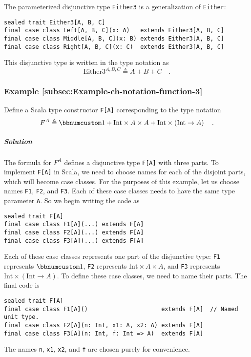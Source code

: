 The parameterized disjunctive type \lstinline!Either3! is a generalization
of \lstinline!Either!:
\begin{lstlisting}
sealed trait Either3[A, B, C]
final case class Left[A, B, C](x: A)   extends Either3[A, B, C]
final case class Middle[A, B, C](x: B) extends Either3[A, B, C]
final case class Right[A, B, C](x: C)  extends Either3[A, B, C]
\end{lstlisting}
This disjunctive type is written in the type notation as
\[
\text{Either3}^{A,B,C}\triangleq A+B+C\quad.
\]


\subsubsection{Example \label{subsec:Example-ch-notation-function-3}\ref{subsec:Example-ch-notation-function-3}}

Define a Scala type constructor \lstinline!F[A]! corresponding to
the type notation 
\[
F^{A}\triangleq\bbnum 1+\text{Int}\times A\times A+\text{Int}\times\left(\text{Int}\rightarrow A\right)\quad.
\]


\subparagraph{Solution}

The formula for $F^{A}$ defines a disjunctive type \lstinline!F[A]!
with three parts. To implement \lstinline!F[A]! in Scala, we need
to choose names for each of the disjoint parts, which will become
case classes. For the purposes of this example, let us choose names
\lstinline!F1!, \lstinline!F2!, and \lstinline!F3!. Each of these
case classes needs to have the same type parameter \lstinline!A!.
So we begin writing the code as
\begin{lstlisting}
sealed trait F[A]
final case class F1[A](...) extends F[A]
final case class F2[A](...) extends F[A]
final case class F3[A](...) extends F[A]
\end{lstlisting}
Each of these case classes represents one part of the disjunctive
type: \lstinline!F1! represents $\bbnum 1$, \lstinline!F2! represents
$\text{Int}\times A\times A$, and \lstinline!F3! represents $\text{Int}\times\left(\text{Int}\rightarrow A\right)$.
To define these case classes, we need to name their parts. The final
code is
\begin{lstlisting}
sealed trait F[A]
final case class F1[A]()                     extends F[A]  // Named unit type.
final case class F2[A](n: Int, x1: A, x2: A) extends F[A]
final case class F3[A](n: Int, f: Int => A)  extends F[A]
\end{lstlisting}
The names \lstinline!n!, \lstinline!x1!, \lstinline!x2!, and \lstinline!f!
are chosen purely for convenience.

